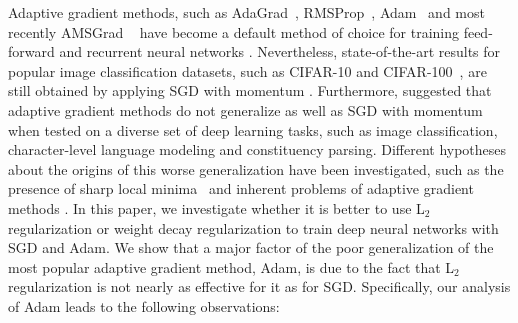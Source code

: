 \documentclass[usenames,dvipsnames]{article}
\newcommand{\vc}[1]{\textit{\textbf{#1}}}
\begin{document}
\def\UU{{\rm I\hspace{-0.50ex}U}}

\def\RR{{\rm I\hspace{-0.50ex}R}}

\def\NormOI{{\mathcal N}  \hspace{-0.13em}\left({\ma{0}, \ensuremath{\ma{I}}\,}\right)}
\def\ONE{{\rm 1\hspace{-0.80ex}1}}
\def\Id{\ensuremath{\ma{I}}}
\def\MYUNDERLINE{ $\noindent\underline{\makebox[0.06in][l]{}}$ }
\def\x{\bm{\theta}}
\def\y{\vc{y}}
\def\m{\vc{m}}
\def\vy{\vc{y}}
\newcommand{\HYP}{H}
\def\UU{{\rm I\hspace{-0.60ex}U}}

Adaptive gradient methods, such as AdaGrad~\citep{duchi2011adaptive}, RMSProp~\citep{tieleman2012lecture}, Adam~\citep{kingma2014adam} and most recently AMSGrad ~\citep{reddi2018iclr} have become a default method of choice for training feed-forward and recurrent neural networks \citep{xu2015show,  radford2015unsupervised}. Nevertheless, state-of-the-art results for popular image classification datasets, such as CIFAR-10 and CIFAR-100~\cite{krizhevsky2009learning}, are still obtained by applying SGD with momentum \citep{gastaldi2017shake, cubuk2018autoaugment}. Furthermore, \cite{wilson2017marginal} suggested that adaptive gradient methods do not generalize as well as SGD with momentum when tested on a diverse set of deep learning tasks, such as image classification, character-level language modeling and constituency parsing.
Different hypotheses about the origins of this worse generalization have been investigated, such as the presence of sharp local minima~\citep{keskar2016large,dinh2017sharp} and inherent problems of adaptive gradient methods \citep{wilson2017marginal}. In this paper, we investigate whether it is better to use L$_2$ regularization or weight decay regularization to train deep neural networks with SGD and Adam. We show that a major factor of the poor generalization of the most popular adaptive gradient method, Adam, is due to the fact that L$_2$ regularization is not nearly as effective for it as for SGD. 
Specifically, our analysis of Adam 
leads to the following observations: 
\end{document}
